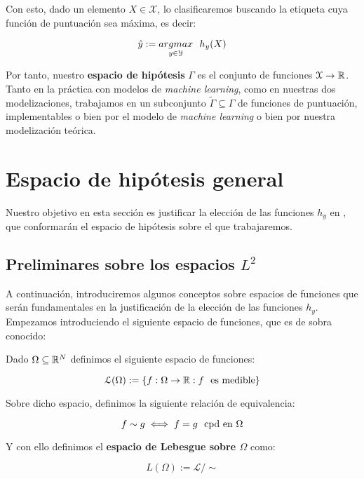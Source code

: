 Con esto, dado un elemento $X \in \mathcal{X}$, lo clasificaremos buscando la etiqueta cuya función de puntuación sea máxima, es decir:

$$\hat{y} := \underset{y \in \mathcal{Y}}{argmax} \ \  h_y(X)$$

Por tanto, nuestro \textbf{espacio de hipótesis} $\Gamma$ es el conjunto de funciones $\mathcal{X} \to \mathbb{R}$. Tanto en la práctica con modelos de \textit{machine learning}, como en nuestras dos modelizaciones, trabajamos en un subconjunto $\tilde{\Gamma} \subseteq \Gamma$ de funciones de puntuación, implementables o bien por el modelo de \textit{machine learning} o bien por nuestra modelización teórica.

\section{Espacio de hipótesis general}

Nuestro objetivo en esta sección es justificar la elección de las funciones $h_y$ en , que conformarán el espacio de hipótesis sobre el que trabajaremos.

\subsection{Preliminares sobre los espacios $L^2$}

A continuación, introduciremos algunos conceptos sobre espacios de funciones que serán fundamentales en la justificación de la elección de las funciones $h_y$. Empezamos introduciendo el siguiente espacio de funciones, que es de sobra conocido:

\begin{definicion}

    Dado $\Omega \subseteq \mathbb{R}^N$ definimos el siguiente espacio de funciones:

    \begin{equation}
        \mathcal{L}(\Omega) := \{f: \Omega \to \mathbb{R} : f \ \  \text{es medible} \}
    \end{equation}

    Sobre dicho espacio, definimos la siguiente relación de equivalencia:

    \begin{equation}
        f \sim g \iff f = g \ \  \text{cpd en } \Omega
    \end{equation}

    Y con ello definimos el \textbf{espacio de Lebesgue sobre $\Omega$} como:

    \begin{equation}
        L(\Omega) := \mathcal{L} / \sim
    \end{equation}
\end{definicion}

